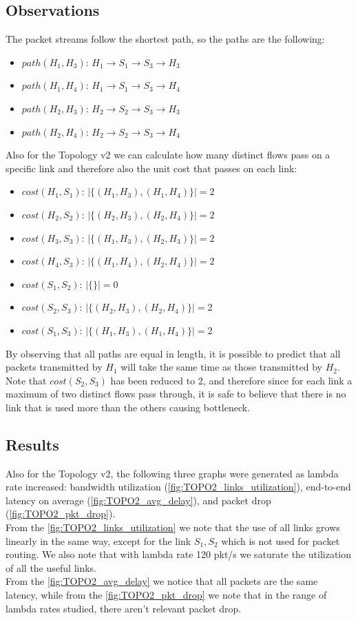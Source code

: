 \documentclass{article}
\begin{document}
\subsection{Observations}
The packet streams follow the shortest path, so the paths are the following:
\begin{itemize}
    \item $path(H_1, H_3)$: $H_1 \rightarrow S_1 \rightarrow S_3 \rightarrow H_3$
    \item $path(H_1, H_4)$: $H_1 \rightarrow S_1 \rightarrow S_3 \rightarrow H_4$
    \item $path(H_2, H_3)$: $H_2 \rightarrow S_2 \rightarrow S_3 \rightarrow H_3$
    \item $path(H_2, H_4)$: $H_2 \rightarrow S_2 \rightarrow S_3 \rightarrow H_4$
\end{itemize}
Also for the Topology v2 we can calculate how many distinct flows pass on a specific link and therefore also the unit cost that passes on each link:
\begin{itemize}
    \item $cost(H_1, S_1)$: $|\{(H_1, H_3), (H_1, H_4)\}| = 2$
    \item $cost(H_2, S_2)$: $|\{(H_2, H_3), (H_2, H_4)\}| = 2$
    \item $cost(H_3, S_3)$: $|\{(H_1, H_3), (H_2, H_3)\}| = 2$
    \item $cost(H_4, S_3)$: $|\{(H_1, H_4), (H_2, H_4)\}| = 2$
    \item $cost(S_1, S_2)$: $|\{\}| = 0$
    \item $cost(S_2, S_3)$: $|\{(H_2, H_3), (H_2, H_4)\}| = 2$
    \item $cost(S_1, S_3)$: $|\{(H_1, H_3), (H_1, H_4)\}| = 2$
\end{itemize}
By observing that all paths are equal in length, it is possible to predict that all packets transmitted by $H_1$ will take the same time as those transmitted by $H_2$.
Note that $cost(S_2, S_3)$ has been reduced to 2, and therefore since for each link a maximum of two distinct flows pass through, it is safe to believe that there is no link that is used more than the others causing bottleneck.

\subsection{Results}
Also for the Topology v2, the following three graphs were generated as lambda rate increased: bandwidth utilization (\autoref{fig:TOPO2_links_utilization}), end-to-end latency on average (\autoref{fig:TOPO2_avg_delay}), and packet drop (\autoref{fig:TOPO2_pkt_drop}). \\
From the \autoref{fig:TOPO2_links_utilization} we note that the use of all links grows linearly in the same way, except for the link $S_1, S_2$ which is not used for packet routing. We also note that with lambda rate 120 pkt/s we saturate the utilization of all the useful links.\\
From the \autoref{fig:TOPO2_avg_delay} we notice that all packets are the same latency, while from the \autoref{fig:TOPO2_pkt_drop} we note that in the range of lambda rates studied, there aren't relevant packet drop.
\end{document}
